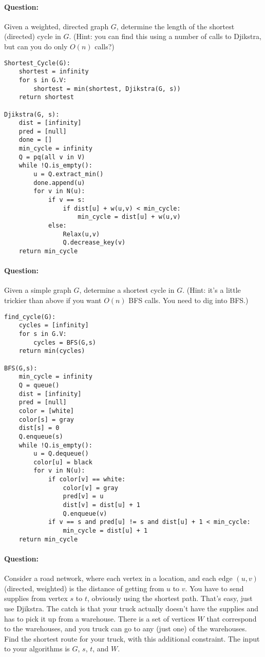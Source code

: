 \documentclass{article}
\begin{document}
\paragraph{Question:} Given a weighted, directed graph \(G\), determine the length of the shortest (directed) cycle in \(G\). (Hint: you can find this using a number of calls to Djikstra, but can you do only \(O(n)\) calls?)

\begin{lstlisting}
Shortest_Cycle(G):
    shortest = infinity
    for s in G.V:
        shortest = min(shortest, Djikstra(G, s))
    return shortest

Djikstra(G, s):
    dist = [infinity]
    pred = [null]
    done = []
    min_cycle = infinity
    Q = pq(all v in V)
    while !Q.is_empty():
        u = Q.extract_min()
        done.append(u)
        for v in N(u):
            if v == s:
                if dist[u] + w(u,v) < min_cycle:
                    min_cycle = dist[u] + w(u,v)
            else:
                Relax(u,v)
                Q.decrease_key(v)
    return min_cycle
\end{lstlisting}

\paragraph{Question:} Given a simple graph \(G\), determine a shortest cycle in \(G\). (Hint: it’s a little trickier than above if you want \(O(n)\) BFS calls. You need to dig into BFS.)

\begin{lstlisting}
find_cycle(G):
    cycles = [infinity]
    for s in G.V:
        cycles = BFS(G,s)
    return min(cycles)

BFS(G,s):
    min_cycle = infinity
    Q = queue()
    dist = [infinity]
    pred = [null]
    color = [white]
    color[s] = gray
    dist[s] = 0
    Q.enqueue(s)
    while !Q.is_empty():
        u = Q.dequeue()
        color[u] = black
        for v in N(u):
            if color[v] == white:
                color[v] = gray
                pred[v] = u
                dist[v] = dist[u] + 1
                Q.enqueue(v)
            if v == s and pred[u] != s and dist[u] + 1 < min_cycle:
                min_cycle = dist[u] + 1
    return min_cycle
\end{lstlisting}

\paragraph{Question:} Consider a road network, where each vertex in a location, and each edge \((u, v)\) (directed, weighted) is the distance of getting from \(u\) to \(v\). You have to send supplies from vertex \(s\) to \(t\), obviously using the shortest path. That’s easy, just use Djikstra. The catch is that your truck actually doesn’t have the supplies and has to pick it up from a warehouse. There is a set of vertices \(W\) that correspond to the warehouses, and you truck can go to any (just one) of the warehouses. Find the shortest route for your truck, with this additional constraint. The input to your algorithms is \(G\), \(s\), \(t\), and \(W\).
\end{document}
